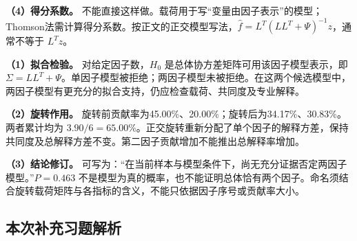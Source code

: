 \textbf{（4）得分系数。} 不能直接这样做。载荷用于写``变量由因子表示''的模型；Thomson法需计算得分系数。按正文的正交模型写法，\(\widehat f=L^T(LL^T+\Psi)^{-1}z\)，通常不等于 \(L^Tz\)。





\textbf{（1）拟合检验。} 对给定因子数，\(H_0\) 是总体协方差矩阵可用该因子模型表示，即 \(\Sigma=LL^T+\Psi\)。单因子模型被拒绝；两因子模型未被拒绝。在这两个候选模型中，两因子模型有更充分的拟合支持，仍应检查载荷、共同度及专业解释。

\textbf{（2）旋转作用。} 旋转前贡献率为45.00\%、20.00\%；旋转后为34.17\%、30.83\%。两者累计均为 \(3.90/6=65.00\%\)。正交旋转重新分配了单个因子的解释方差，保持共同度及总解释方差不变。第二因子贡献增加不能推出总解释率增加。

\textbf{（3）结论修订。} 可写为：``在当前样本与模型条件下，尚无充分证据否定两因子模型。''\(P=0.463\) 不是模型为真的概率，也不能证明总体恰有两个因子。命名须结合旋转载荷矩阵与各指标的含义，不能只依据因子序号或贡献率大小。
\subsection*{本次补充习题解析}

\EndExercises
